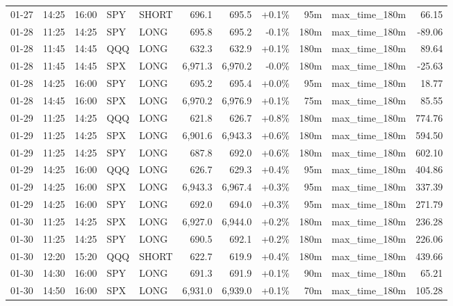 \documentclass[11pt,a4paper,twoside]{article}
\begin{document}
\begin{center}
\begin{longtable}{>{\color{txtmain}}l l l l l r r r r >{\color{txtmain}}l r}
01-27 & 14:25 & 16:00 & SPY & SHORT & 696.1 & 695.5 & \textcolor{wingreen}{+0.1\%} & 95m & max\_time\_180m & \textcolor{wingreen}{66.15} \\
01-28 & 11:25 & 14:25 & SPY & LONG & 695.8 & 695.2 & \textcolor{lossred}{-0.1\%} & 180m & max\_time\_180m & \textcolor{lossred}{-89.06} \\
01-28 & 11:45 & 14:45 & QQQ & LONG & 632.3 & 632.9 & \textcolor{wingreen}{+0.1\%} & 180m & max\_time\_180m & \textcolor{wingreen}{89.64} \\
01-28 & 11:45 & 14:45 & SPX & LONG & 6,971.3 & 6,970.2 & \textcolor{lossred}{-0.0\%} & 180m & max\_time\_180m & \textcolor{lossred}{-25.63} \\
01-28 & 14:25 & 16:00 & SPY & LONG & 695.2 & 695.4 & \textcolor{wingreen}{+0.0\%} & 95m & max\_time\_180m & \textcolor{wingreen}{18.77} \\
01-28 & 14:45 & 16:00 & SPX & LONG & 6,970.2 & 6,976.9 & \textcolor{wingreen}{+0.1\%} & 75m & max\_time\_180m & \textcolor{wingreen}{85.55} \\
01-29 & 11:25 & 14:25 & QQQ & LONG & 621.8 & 626.7 & \textcolor{wingreen}{+0.8\%} & 180m & max\_time\_180m & \textcolor{wingreen}{774.76} \\
01-29 & 11:25 & 14:25 & SPX & LONG & 6,901.6 & 6,943.3 & \textcolor{wingreen}{+0.6\%} & 180m & max\_time\_180m & \textcolor{wingreen}{594.50} \\
01-29 & 11:25 & 14:25 & SPY & LONG & 687.8 & 692.0 & \textcolor{wingreen}{+0.6\%} & 180m & max\_time\_180m & \textcolor{wingreen}{602.10} \\
01-29 & 14:25 & 16:00 & QQQ & LONG & 626.7 & 629.3 & \textcolor{wingreen}{+0.4\%} & 95m & max\_time\_180m & \textcolor{wingreen}{404.86} \\
01-29 & 14:25 & 16:00 & SPX & LONG & 6,943.3 & 6,967.4 & \textcolor{wingreen}{+0.3\%} & 95m & max\_time\_180m & \textcolor{wingreen}{337.39} \\
01-29 & 14:25 & 16:00 & SPY & LONG & 692.0 & 694.0 & \textcolor{wingreen}{+0.3\%} & 95m & max\_time\_180m & \textcolor{wingreen}{271.79} \\
01-30 & 11:25 & 14:25 & SPX & LONG & 6,927.0 & 6,944.0 & \textcolor{wingreen}{+0.2\%} & 180m & max\_time\_180m & \textcolor{wingreen}{236.28} \\
01-30 & 11:25 & 14:25 & SPY & LONG & 690.5 & 692.1 & \textcolor{wingreen}{+0.2\%} & 180m & max\_time\_180m & \textcolor{wingreen}{226.06} \\
01-30 & 12:20 & 15:20 & QQQ & SHORT & 622.7 & 619.9 & \textcolor{wingreen}{+0.4\%} & 180m & max\_time\_180m & \textcolor{wingreen}{439.66} \\
01-30 & 14:30 & 16:00 & SPY & LONG & 691.3 & 691.9 & \textcolor{wingreen}{+0.1\%} & 90m & max\_time\_180m & \textcolor{wingreen}{65.21} \\
01-30 & 14:50 & 16:00 & SPX & LONG & 6,931.0 & 6,939.0 & \textcolor{wingreen}{+0.1\%} & 70m & max\_time\_180m & \textcolor{wingreen}{105.28} \\
\end{longtable}
\end{center}
\clearpage
\end{document}
